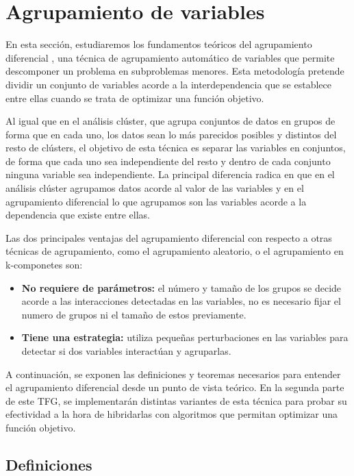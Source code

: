 
\chapter{Agrupamiento de variables}

En esta sección, estudiaremos los fundamentos teóricos del agrupamiento diferencial \cite{DG2} \cite{RDG} \cite{Teoremas_DG2} \cite{ERDG} , una técnica de agrupamiento automático de variables que permite descomponer un problema en subproblemas menores. Esta metodología pretende dividir un conjunto de variables acorde a la interdependencia que se establece entre ellas cuando se trata de optimizar una función objetivo.

Al igual que en el análisis clúster, que agrupa conjuntos de datos en grupos de forma que en cada uno, los datos sean lo más parecidos posibles y distintos del resto de clústers, el objetivo de esta técnica es separar las variables en conjuntos, de forma que cada uno sea independiente del resto y dentro de cada conjunto ninguna variable sea independiente. La principal diferencia radica en que en el análisis clúster agrupamos datos acorde al valor de las variables y en el agrupamiento diferencial lo que agrupamos son las variables acorde a la dependencia que existe entre ellas.

Las dos principales ventajas del agrupamiento diferencial con respecto a otras técnicas de agrupamiento, como el agrupamiento aleatorio, o el agrupamiento en k-componetes son:
\begin{itemize}
	\item \textbf{No requiere de parámetros:} el número y tamaño de los grupos se decide acorde a las interacciones detectadas en las variables, no es necesario fijar el numero de grupos ni el tamaño de estos previamente.
	\item \textbf{Tiene una estrategia:} utiliza pequeñas perturbaciones en las variables para detectar si dos variables interactúan y agruparlas.
\end{itemize}

A continuación, se exponen las definiciones y teoremas necesarios para entender el agrupamiento diferencial desde un punto de vista teórico. En la segunda parte de este TFG, se implementarán distintas variantes de esta técnica para probar su efectividad a la hora de hibridarlas con algoritmos que permitan optimizar una función objetivo.

\section{Definiciones}

